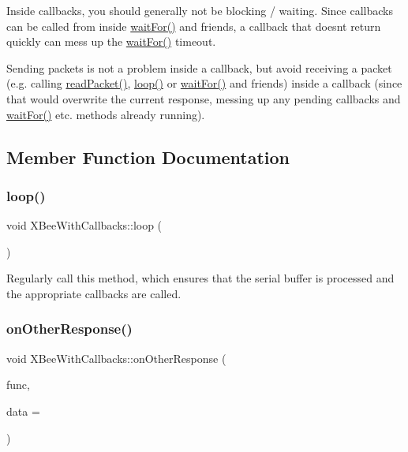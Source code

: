 Inside callbacks, you should generally not be blocking / waiting. Since callbacks can be called from inside \hyperlink{class_x_bee_with_callbacks_aca6a7f82b94c3d2dc4353c0a18404da7}{wait\+For()} and friends, a callback that doesn\textquotesingle{}t return quickly can mess up the \hyperlink{class_x_bee_with_callbacks_aca6a7f82b94c3d2dc4353c0a18404da7}{wait\+For()} timeout.

Sending packets is not a problem inside a callback, but avoid receiving a packet (e.\+g. calling \hyperlink{class_x_bee_a7d788232f44e8b3c10dc686a0299fcc6}{read\+Packet()}, \hyperlink{class_x_bee_with_callbacks_aec6a4688f09fef714c377ede587b5ba9}{loop()} or \hyperlink{class_x_bee_with_callbacks_aca6a7f82b94c3d2dc4353c0a18404da7}{wait\+For()} and friends) inside a callback (since that would overwrite the current response, messing up any pending callbacks and \hyperlink{class_x_bee_with_callbacks_aca6a7f82b94c3d2dc4353c0a18404da7}{wait\+For()} etc. methods already running). 

\subsection{Member Function Documentation}
\hypertarget{class_x_bee_with_callbacks_aec6a4688f09fef714c377ede587b5ba9}{}\label{class_x_bee_with_callbacks_aec6a4688f09fef714c377ede587b5ba9} 
\subsubsection{\texorpdfstring{loop()}{loop()}}
{\footnotesize\ttfamily void X\+Bee\+With\+Callbacks\+::loop (\begin{DoxyParamCaption}{ }\end{DoxyParamCaption})}

Regularly call this method, which ensures that the serial buffer is processed and the appropriate callbacks are called. \hypertarget{class_x_bee_with_callbacks_aef62897f97a946cba21ba37c5ee2ef26}{}\label{class_x_bee_with_callbacks_aef62897f97a946cba21ba37c5ee2ef26} 
\subsubsection{\texorpdfstring{on\+Other\+Response()}{onOtherResponse()}}
{\footnotesize\ttfamily void X\+Bee\+With\+Callbacks\+::on\+Other\+Response (\begin{DoxyParamCaption}\item[{void($\ast$)(\hyperlink{class_x_bee_response}{X\+Bee\+Response} \&, uintptr\+\_\+t)}]{func,  }\item[{uintptr\+\_\+t}]{data = {} }\end{DoxyParamCaption})\hspace{0.3cm}{\ttfamily [inline]}}


